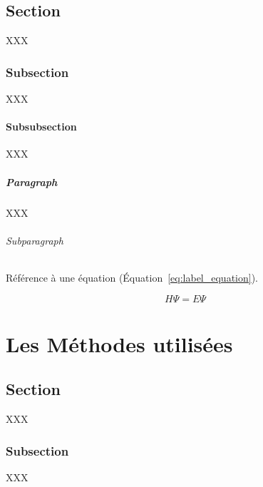 \documentclass[a4paper,12pt]{book}
\newcommand{\clearplaindoublepage}{%
\newpage{\pagestyle{plain}\cleardoublepage}}
\begin{document}
\section{Section}

XXX

\subsection{Subsection}

XXX

\subsubsection{Subsubsection}

XXX

\paragraph{Paragraph}

XXX

\subparagraph{Subparagraph}

Référence à une équation (Équation~\ref{eq:label_equation}).

\begin{equation}
H \Psi = E \Psi
\label{eq:label_equation}
\end{equation}





\clearplaindoublepage
%



\clearplaindoublepage
%

\chapter{Les Méthodes utilisées}
\label{chap:methodes_pratiques}
 
\section{Section}

XXX

\subsection{Subsection}

XXX
\end{document}

